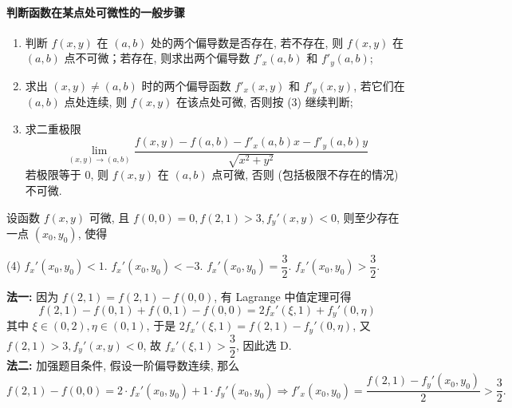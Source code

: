\paragraph{判断函数在某点处可微性的一般步骤}
\begin{enumerate}[label=(\arabic{*})]
    \item 判断 $f(x,y)$ 在 $(a,b)$ 处的两个偏导数是否存在, 若不存在, 则 $f(x,y)$ 在 $(a,b)$ 点不可微；若存在, 则求出两个偏导数 $f'_x(a,b)$ 和 $f'_y(a,b)$;
    \item 求出 $(x,y)\neq (a,b)$ 时的两个偏导函数 $f'_x(x,y)$ 和 $f'_y(x,y)$, 若它们在 $(a,b)$ 点处连续, 则 $f(x,y)$ 在该点处可微, 否则按 (3) 继续判断;
    \item 求二重极限 $$\lim_{(x,y)\to(a,b)}\dfrac{f(x,y)-f(a,b)-f'_x(a,b)x-f'_y(a,b)y}{\sqrt{x^2+y^2}}$$ 若极限等于 0, 则 $f(x,y)$ 在 $(a,b)$ 点可微, 否则 (包括极限不存在的情况) 不可微.
\end{enumerate}

\begin{example}
    设函数 $f(x,y)$ 可微, 且 $f(0,0)=0, f(2,1)>3, f_y'(x,y)<0$, 则至少存在一点 $(x_0,y_0)$, 使得 
    \begin{tasks}(4)
        \task $f_x'(x_0,y_0)<1.$
        \task $f_x'(x_0,y_0)<-3.$
        \task $f_x'(x_0,y_0)=\dfrac{3}{2}.$
        \task $f_x'(x_0,y_0)>\dfrac{3}{2}.$
    \end{tasks}
\end{example}
\begin{solution}
    \textbf{法一: }因为 $f(2,1)=f(2,1)-f(0,0)$, 有 Lagrange 中值定理可得 
    $$
    f(2,1)-f(0,1)+f(0,1)-f(0,0)=2f_x'(\xi,1)+f_y'(0, \eta)
    $$
    其中 $\xi\in(0,2),\eta\in(0,1)$, 于是 $2f_x'(\xi,1)=f(2,1)-f_y'(0,\eta)$, 又 $f(2,1)>3, f_y'(x,y)<0$, 故 $f_x'(\xi,1)>\dfrac{3}{2}$, 因此选 D. \\ 
    \textbf{法二: }加强题目条件, 假设一阶偏导数连续, 那么 $$
    f(2,1)-f(0,0)=2\cdot f_x'(x_0,y_0)+1\cdot f_y'(x_0,y_0)\Rightarrow f'_x(x_0,y_0)=\dfrac{f(2,1)-f_y'(x_0,y_0)}{2}>\dfrac{3}{2}.
    $$
\end{solution}

